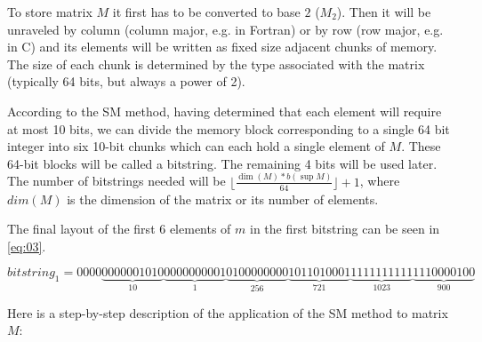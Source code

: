 \documentclass[10pt]{article}
\begin{document}
To store matrix $M$ it first has to be converted to base $2$ ($M_2$). Then it will be unraveled by column (column major, e.g. in Fortran) or by row (row major, e.g. in C) and its elements will be written as  fixed size adjacent chunks of memory. The size of each chunk is determined by the type associated with the matrix (typically 64 bits, but always a power of 2).

According to the SM method, having determined that each element will require at most 10 bits, we can divide the memory block corresponding to a single 64 bit integer into six 10-bit chunks which can each hold a single element of $M$. These 64-bit blocks will be called a bitstring. The remaining 4 bits will be used later. The number of bitstrings needed will be $\lfloor \frac{\dim(M) *b(\sup M)} {64} \rfloor +1$, where $dim(M)$ is the dimension of the matrix or its number of elements.

The final layout of the first 6 elements of $m$ in the first bitstring can be seen in \ref{eq:03}.

\begin{equation}\label{eq:03}
 bitstring_1 = 0000\underbrace{0000001010}_{10}\underbrace{0000000001}_{1}\underbrace{0100000000}_{256}\underbrace{1011010001}_{721}\underbrace{1111111111}_{1023}\underbrace{1110000100}_{900} 
\end{equation}

Here is a step-by-step description of the application of the SM method to matrix $M$:
\end{document}
